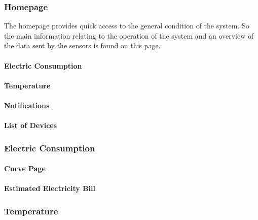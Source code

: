 \subsubsection{Homepage}

The homepage provides quick access to the general condition of the system.
So the main information relating to the operation of the system and an overview of the data sent by the sensors is found on this page.


    \paragraph{Electric Consumption}
    \paragraph{Temperature}
    \paragraph{Notifications}
    \paragraph{List of Devices} %

\subsubsection{Electric Consumption}

    \paragraph{Curve Page}
    
    \paragraph{Estimated Electricity Bill}

\subsubsection{Temperature}